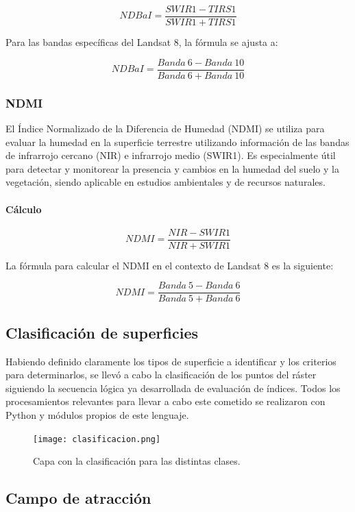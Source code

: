$$NDBaI=\frac{SWIR1-TIRS1}{SWIR1+TIRS1}$$

Para las bandas específicas del Landsat 8, la fórmula se ajusta a:

$$NDBaI=\frac{Banda~6-Banda~10}{Banda~6+Banda~10}$$

\subsubsection{NDMI}

El Índice Normalizado de la Diferencia de Humedad (NDMI) se utiliza para evaluar la humedad en la superficie terrestre utilizando información de las bandas de infrarrojo cercano (NIR) e infrarrojo medio (SWIR1). Es especialmente útil para detectar y monitorear la presencia y cambios en la humedad del suelo y la vegetación, siendo aplicable en estudios ambientales y de recursos naturales.

\paragraph{Cálculo}

$$NDMI=\frac{NIR-SWIR1}{NIR+SWIR1}$$

La fórmula para calcular el NDMI en el contexto de Landsat 8 es la siguiente:

$$NDMI=\frac{Banda~5-Banda~6}{Banda~5+Banda~6}$$

\subsection{Clasificación de superficies}

Habiendo definido claramente los tipos de superficie a identificar y los criterios para determinarlos, se llevó a cabo la clasificación de los puntos del ráster siguiendo la secuencia lógica ya desarrollada de evaluación de índices. Todos los procesamientos relevantes para llevar a cabo este cometido se realizaron con Python y módulos propios de este lenguaje.

\begin{figure}[H]
	\texttt{[image: clasificacion.png]}
	\centering
	\caption{Capa con la clasificación para las distintas clases.}
	\label{fig:clasificacion}
\end{figure}

\subsection{Campo de atracción} \label{campo-de-atraccion}

